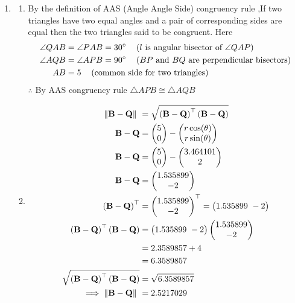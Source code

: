 \documentclass[11pt]{book}
\begin{document}
\begin{enumerate}
\item  
\begin{enumerate}
        \item By the definition of AAS (Angle Angle Side) congruency rule ,If two triangles have two equal angles and a pair of corresponding sides are equal then the two triangles said to be congruent.
%
Here
  \begin{align}
            \angle QAB  &= \angle PAB = 30\degree \hspace{12pt}   \text{($l$ is angular bisector of  $\angle QAP$)}  \\
            \angle AQB  &= \angle APB = 90 \degree  \hspace{12pt}  \text{($BP$ and $BQ$ are perpendicular bisectors)} \\
            AB &=5  \hspace{12pt}  \text{(common side for two triangles)} 
        \end{align} 
    $\therefore$ By AAS congruency rule  $\triangle  APB \cong \triangle AQB$  
    \item  \begin{align}
\norm{\vec{B}-\vec{Q}}\ &=  \sqrt{\brak{\vec{B}-\vec{Q}}^{\top}\brak{\vec{B}-\vec{Q}}} \\
\vec{B}-\vec{Q} &= \myvec{5 \\ 0} - \myvec{r\cos(\theta) \\ r\sin(\theta)} \\
\vec{B}-\vec{Q} &= \myvec{5 \\ 0} - \myvec{3.464101 \\ 2} \\
\vec{B}-\vec{Q} &= \myvec{1.535899 \\ -2} \\
\brak{\vec{B}-\vec{Q}}^{\top} &= {\myvec{1.535899 \\ -2}}^{\top} = \myvec{1.535899 \ -2} \\
\brak{\vec{B}-\vec{Q}}^{\top}\brak{\vec{B}-\vec{Q}} &= \myvec{1.535899 \ -2} \myvec{1.535899 \\ -2}\\
&= 2.3589857 + 4 \\
&= 6.3589857 \\  
\sqrt{\brak{\vec{B}-\vec{Q}}^{\top}\brak{\vec{B}-\vec{Q}}} &= \sqrt{6.3589857}	\\
\implies \norm{\vec{B}-\vec{Q}}\ &= 2.5217029 
\end{align}
\begin{align}

\end{align}
\end{enumerate}
\end{enumerate}
\end{document}
